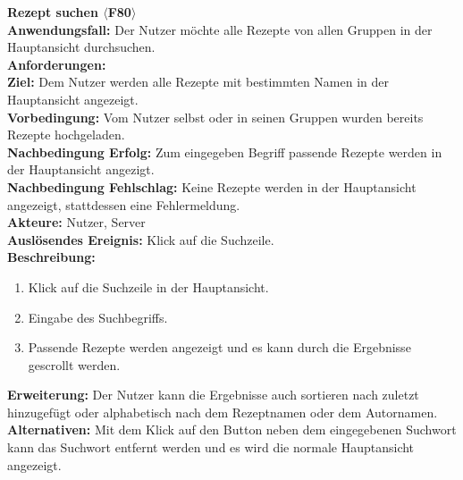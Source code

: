 \documentclass[parskip=full]{scrartcl}
\begin{document}
\textbf{Rezept suchen $\langle$F80$\rangle$}\\
\textbf{Anwendungsfall:} Der Nutzer möchte alle Rezepte von allen Gruppen in der Hauptansicht durchsuchen.\\
\textbf{Anforderungen:} \\
\textbf{Ziel:} Dem Nutzer werden alle Rezepte mit bestimmten Namen in der Hauptansicht angezeigt.\\
\textbf{Vorbedingung:} Vom Nutzer selbst oder in seinen Gruppen wurden bereits Rezepte hochgeladen.\\
\textbf{Nachbedingung Erfolg:} Zum eingegeben Begriff passende Rezepte werden in der Hauptansicht angezigt.\\
\textbf{Nachbedingung Fehlschlag:} Keine Rezepte werden in der Hauptansicht angezeigt, stattdessen eine Fehlermeldung.\\
\textbf{Akteure:} Nutzer, Server\\
\textbf{Auslösendes Ereignis:} Klick auf die Suchzeile.\\
\textbf{Beschreibung:}
\begin{enumerate}
    \item Klick auf die Suchzeile in der Hauptansicht.
    \item Eingabe des Suchbegriffs.
    \item Passende Rezepte werden angezeigt und es kann durch die Ergebnisse gescrollt werden.
\end{enumerate}
\textbf{Erweiterung:} Der Nutzer kann die Ergebnisse auch sortieren nach zuletzt hinzugefügt oder alphabetisch nach dem Rezeptnamen oder dem Autornamen.\\
\textbf{Alternativen:} Mit dem Klick auf den Button neben dem eingegebenen Suchwort kann das Suchwort entfernt werden und es wird die normale Hauptansicht angezeigt.\\
\newpage
\end{document}
